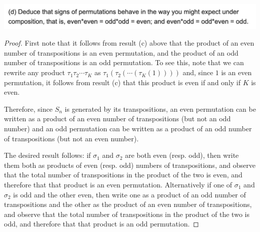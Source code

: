 \begin{mdframed}
\includegraphics[width=400pt]{img/algebra--nf--2-05a9.png}
\end{mdframed}

\begin{proof}
  First note that it follows from result (c) above that the product of an even number of
  transpositions is an even permutation, and the product of an odd number of transpositions is an
  odd permutation. To see this, note that we can rewrite any product $\tau_1\tau_2\cdots\tau_K$
  as $\tau_1(\tau_2(\cdots(\tau_K(1))))$ and, since $1$ is an even permutation, it follows from
  result (c) that this product is even if and only if $K$ is even.

  Therefore, since $S_n$ is generated by its transpositions, an even permutation can be written as
  a product of an even number of transpositions (but not an odd number) and an odd permutation can
  be written as a product of an odd number of transpositions (but not an even number).

  The desired result follows: if $\sigma_1$ and $\sigma_2$ are both even (resp. odd), then write them both as
  products of even (resp. odd) numbers of transpositions, and observe that the total number of
  transpositions in the product of the two is even, and therefore that that product is an even
  permutation. Alternatively if one of $\sigma_1$ and $\sigma_2$ is odd and the other even, then write one as
  a product of an odd number of transpositions and the other as the product of an even number of
  transpositions, and observe that the total number of transpositions in the product of the two is
  odd, and therefore that that product is an odd permutation.
\end{proof}
